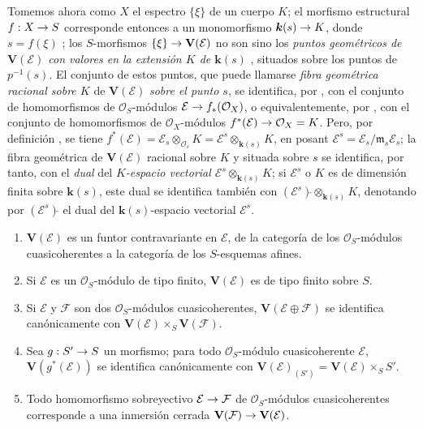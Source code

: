 \documentclass[oneside,10pt]{amsart}
\makeatletter
\newcommand{\ega@arrow}[2]{\mathchoice{#1}{#2}{#2}{#2}}
\renewcommand{\to}{\ega@arrow{\longrightarrow}{\rightarrow}}
\let\EGAOriginalLabel\label
\renewcommand{\label}[1]{\phantomsection\EGAOriginalLabel{#1}}
\makeatother
\begin{document}
\begin{env}[1.7.10]
\label{II.1.7.10-fr}
Tomemos ahora como $X$ el espectro $\{\xi\}$ de un cuerpo $K$; el morfismo estructural $f:X\to S$ corresponde entonces a un monomorfismo $\boldsymbol{k}(s)\to K$, donde $s=f(\xi)$ ; los $S$-morfismos $\{\xi\}\to\mathbf{V}(\mathcal{E})$ no son sino los \emph{puntos geométricos de $\mathbf{V}(\mathcal{E})$ con valores en la extensión $K$ de $\boldsymbol{k}(s)$} , situados sobre los puntos de $p^{-1}(s)$.
El conjunto de estos puntos, que puede llamarse \emph{fibra geométrica racional sobre $K$} de $\mathbf{V}(\mathcal{E})$ \emph{sobre el punto $s$}, se identifica, por , con el conjunto de homomorfismos de $\mathcal{O}_S$-módulos $\mathcal{E}\to f_*(\mathcal{O}_X)$, o equivalentemente, por , con el conjunto de homomorfismos de $\mathcal{O}_X$-módulos $f^*(\mathcal{E})\to\mathcal{O}_X=K$.
Pero, por definición , se tiene
$f^*(\mathcal{E})=\mathcal{E}_s\otimes_{\mathcal{O}_s}K
=\mathcal{E}^s\otimes_{\boldsymbol{k}(s)}K$, en posant
$\mathcal{E}^s=\mathcal{E}_s/\mathfrak{m}_s\mathcal{E}_s$;
la fibra geométrica de $\mathbf{V}(\mathcal{E})$ racional sobre $K$ y situada sobre $s$ se identifica, por tanto, con el \emph{dual} del \emph{$K$-espacio vectorial $\mathcal{E}^s\otimes_{\boldsymbol{k}(s)}K$}; si $\mathcal{E}^s$ o $K$ es de dimensión finita sobre $\boldsymbol{k}(s)$, este dual se identifica también con $(\mathcal{E}^s)\check{}\otimes_{\boldsymbol{k}(s)}K$, denotando por $(\mathcal{E}^s)\check{}$ el dual del $\boldsymbol{k}(s)$-espacio vectorial $\mathcal{E}^s$.
\end{env}

\begin{proposition}[1.7.11]
\label{II.1.7.11-fr}
\medskip\noindent
\begin{enumerate}
  \item[{\rm(i)}] $\mathbf{V}(\mathcal{E})$ es un funtor contravariante en $\mathcal{E}$, de la categoría de los $\mathcal{O}_S$-módulos cuasicoherentes a la categoría de los $S$-esquemas afines.
  \item[{\rm(ii)}] Si $\mathcal{E}$ es un $\mathcal{O}_S$-módulo de tipo finito, $\mathbf{V}(\mathcal{E})$ es de tipo finito sobre $S$.
  \item[{\rm(iii)}] Si $\mathcal{E}$ y $\mathcal{F}$ son dos $\mathcal{O}_S$-módulos cuasicoherentes, $\mathbf{V}(\mathcal{E}\oplus\mathcal{F})$ se identifica canónicamente con $\mathbf{V}(\mathcal{E})\times_S\mathbf{V}(\mathcal{F})$.
  \item[{\rm(iv)}] Sea $g:S'\to S$ un morfismo; para todo $\mathcal{O}_S$-módulo cuasicoherente $\mathcal{E}$, $\mathbf{V}(g^*(\mathcal{E}))$ se identifica canónicamente con $\mathbf{V}(\mathcal{E})_{(S')}
    =\mathbf{V}(\mathcal{E})\times_S S'$.
  \item[{\rm(v)}] Todo homomorfismo sobreyectivo $\mathcal{E}\to\mathcal{F}$ de $\mathcal{O}_S$-módulos cuasicoherentes corresponde a una inmersión cerrada $\mathbf{V}(\mathcal{F})\to\mathbf{V}(\mathcal{E})$.
\end{enumerate}
\end{proposition}
\end{document}
